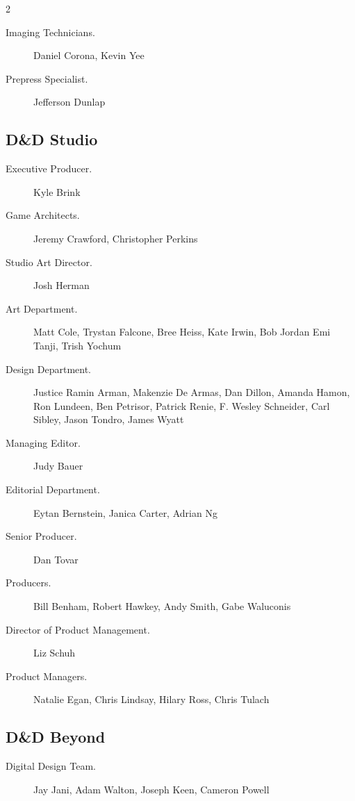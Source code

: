 \documentclass[10pt,a4paper,twoside,bg=print,twocolumn,openany,nodeprecatedcode]{dndbook}
\begin{document}
\begin{description}
\begin{multicols}{2}
\begin{description}
\item[Imaging Technicians.]
Daniel Corona, Kevin Yee

\item[Prepress Specialist.]
Jefferson Dunlap

\end{description}

\subsection{D\&D Studio}

\begin{description}
\item[Executive Producer.]
Kyle Brink

\item[Game Architects.]
Jeremy Crawford, Christopher Perkins

\item[Studio Art Director.]
Josh Herman

\item[Art Department.]
Matt Cole, Trystan Falcone, Bree Heiss, Kate Irwin, Bob Jordan Emi Tanji, Trish Yochum

\item[Design Department.]
Justice Ramin Arman, Makenzie De Armas, Dan Dillon, Amanda Hamon, Ron Lundeen, Ben Petrisor, Patrick Renie, F. Wesley Schneider, Carl Sibley, Jason Tondro, James Wyatt

\item[Managing Editor.]
Judy Bauer

\item[Editorial Department.]
Eytan Bernstein, Janica Carter, Adrian Ng

\item[Senior Producer.]
Dan Tovar

\item[Producers.]
Bill Benham, Robert Hawkey, Andy Smith, Gabe Waluconis

\item[Director of Product Management.]
Liz Schuh

\item[Product Managers.]
Natalie Egan, Chris Lindsay, Hilary Ross, Chris Tulach

\end{description}

\subsection{D\&D Beyond}

\begin{description}
\item[Digital Design Team.]
Jay Jani, Adam Walton, Joseph Keen, Cameron Powell

\end{description}

\end{multicols}

\end{description}
\end{document}

